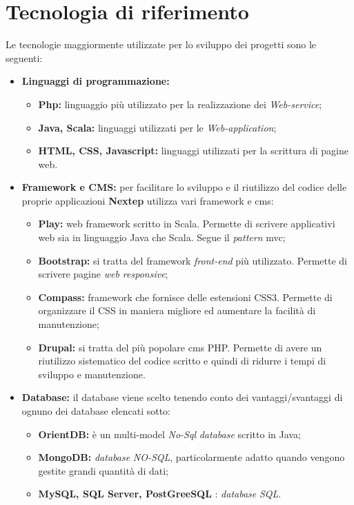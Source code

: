 \section{Tecnologia di riferimento}
Le tecnologie maggiormente utilizzate per lo sviluppo dei progetti sono le seguenti:
\begin{itemize}
	\item \textbf{Linguaggi di programmazione: }
	\begin{itemize}
		\item \textbf{Php: }linguaggio più utilizzato per la realizzazione dei \textit{Web-service};
		\item \textbf{Java, Scala: }linguaggi utilizzati per le \textit{Web-application};
		\item \textbf{HTML, CSS, Javascript: }linguaggi utilizzati per la scrittura di pagine web.
	\end{itemize}
	\item \textbf{Framework e CMS: }per facilitare lo sviluppo e il riutilizzo del codice delle proprie applicazioni \textbf{Nextep }utilizza vari \gls{framework} e \gls{cms}:
	\begin{itemize}
		\item \textbf{Play: }web \gls{framework} scritto in Scala. Permette di scrivere applicativi web sia in linguaggio Java che Scala. Segue il \textit{pattern }\gls{mvc};
		\item \textbf{Bootstrap: }si tratta del \gls{framework} \textit{front-end }più utilizzato. Permette di scrivere pagine \textit{web responsive};
		\item \textbf{Compass: }\gls{framework} che fornisce delle estensioni CSS3. Permette di organizzare il CSS in maniera migliore ed aumentare la facilità di manutenzione;
		\item \textbf{Drupal: }si tratta del più popolare \gls{cms} PHP. Permette di avere un riutilizzo sistematico del codice scritto e quindi di ridurre i tempi di sviluppo e manutenzione.
	\end{itemize}
	\item \textbf{Database: }il database viene scelto tenendo conto dei vantaggi/svantaggi di ognuno dei database elencati sotto:
	\begin{itemize}
		\item \textbf{OrientDB: }è un multi-model \textit{No-Sql }\textit{database }scritto in Java;
		\item \textbf{MongoDB: }\textit{database} \textit{NO-SQL}, particolarmente adatto quando vengono gestite grandi quantità di dati;
		\item \textbf{MySQL, SQL Server, PostGreeSQL }: \textit{database }\textit{SQL}.
	\end{itemize}
\end{itemize}
